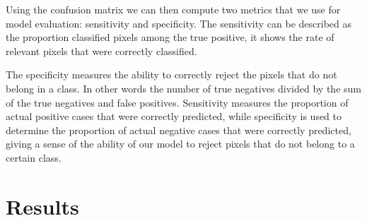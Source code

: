 \documentclass[12pt,a4paper]{scrartcl}
\begin{document}
Using the confusion matrix we can then compute two metrics that we use for model evaluation: sensitivity and specificity. 
The sensitivity can be described as the proportion classified pixels among the true positive, it shows the rate of relevant pixels that were correctly classified. 

The specificity measures the ability to correctly reject the pixels that do not belong in a class. In other words the number of true negatives divided by the sum of the true negatives and false positives. Sensitivity measures  the proportion of actual positive cases that were correctly predicted, while specificity is used to determine the proportion of actual negative cases that were correctly predicted, giving a sense of the ability of our model to reject pixels that do not belong to a certain class. 


\section{Results}
\end{document}
